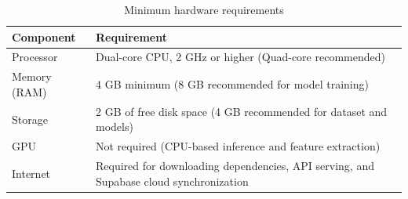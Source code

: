 \begin{table}[htbp]
\centering
\begin{tabular}{|p{4.5cm}|p{10.5cm}|}
\hline
Component & Requirement \\
\hline
Processor & Dual-core CPU, 2 GHz or higher (Quad-core recommended) \\
\hline
Memory (RAM) & 4 GB minimum (8 GB recommended for model training) \\
\hline
Storage & 2 GB of free disk space (4 GB recommended for dataset and models) \\
\hline
GPU & Not required (CPU-based inference and feature extraction) \\
\hline
Internet & Required for downloading dependencies, API serving, and Supabase cloud synchronization \\
\hline
\end{tabular}
\caption{Minimum hardware requirements}\label{tab:appendix_hardware}
\end{table}
